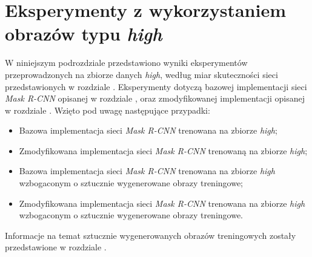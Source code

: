 \section{Eksperymenty z wykorzystaniem obrazów typu \textit{high}}
W niniejszym podrozdziale przedstawiono wyniki eksperymentów przeprowadzonych na zbiorze danych \textit{high}, według miar skuteczności sieci przedstawionych w rozdziale .
Eksperymenty dotyczą bazowej implementacji sieci \textit{Mask R-CNN} \cite{matterport-mask-rcnn} opisanej w rozdziale , oraz zmodyfikowanej implementacji opisanej w rozdziale .
 Wzięto pod uwagę następujące przypadki:

\begin{itemize}
 \item Bazowa implementacja sieci \textit{Mask R-CNN} trenowana na zbiorze \textit{high};
 \item Zmodyfikowana implementacja sieci \textit{Mask R-CNN} trenowaną na zbiorze \textit{high};
 \item Bazowa implementacja sieci \textit{Mask R-CNN} trenowana na zbiorze \textit{high} wzbogaconym o sztucznie wygenerowane obrazy treningowe;
 \item Zmodyfikowana implementacja sieci \textit{Mask R-CNN} trenowana na zbiorze \textit{high} wzbogaconym o sztucznie wygenerowane obrazy treningowe.
\end{itemize}

Informacje na temat sztucznie wygenerowanych obrazów treningowych zostały przedstawione w rozdziale .
